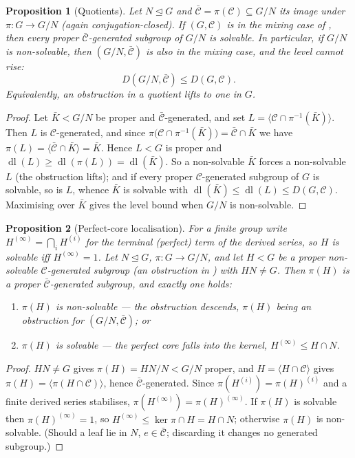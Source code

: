 \documentclass[11pt]{amsart}
\newtheorem{proposition}[proposition]{Proposition}
\theoremstyle{definition}
\theoremstyle{remark}
\theoremstyle{plain}
\theoremstyle{plain}
\numberwithin{equation}{section}
\begin{document}
\begin{proposition}[Quotients]
\label{prop:quotient}
Let $N\trianglelefteq G$ and $\bar{\mathcal C}=\pi(\mathcal C)\subseteq G/N$ its image under
$\pi:G\to G/N$ (again conjugation-closed). If $(G,\mathcal C)$ is in the mixing case of
, then every proper $\bar{\mathcal C}$-generated subgroup of $G/N$ is
solvable. In particular, if $G/N$ is non-solvable, then $(G/N,\bar{\mathcal C})$ is also in the
mixing case, and the level cannot rise:
\[
D(G/N,\bar{\mathcal C})\le D(G,\mathcal C).
\]
Equivalently, an obstruction in a quotient lifts to one in $G$.
\end{proposition}
\begin{proof}
Let $\bar K<G/N$ be proper and $\bar{\mathcal C}$-generated, and set
$L=\langle\mathcal C\cap\pi^{-1}(\bar K)\rangle$. Then $L$ is $\mathcal C$-generated, and since
$\pi\bigl(\mathcal C\cap\pi^{-1}(\bar K)\bigr)=\bar{\mathcal C}\cap\bar K$ we have
$\pi(L)=\langle\bar{\mathcal C}\cap\bar K\rangle=\bar K$. Hence $L<G$ is proper and
$\operatorname{dl}(L)\ge\operatorname{dl}(\pi(L))=\operatorname{dl}(\bar K)$. So a non-solvable
$\bar K$ forces a non-solvable $L$ (the obstruction lifts); and if every proper $\mathcal
C$-generated subgroup of $G$ is solvable, so is $L$, whence $\bar K$ is solvable with
$\operatorname{dl}(\bar K)\le\operatorname{dl}(L)\le D(G,\mathcal C)$. Maximising over $\bar K$
gives the level bound when $G/N$ is non-solvable.
\end{proof}



\begin{proposition}[Perfect-core localisation]
\label{prop:perfectcore}
For a finite group write $H^{(\infty)}=\bigcap_iH^{(i)}$ for the terminal (perfect) term of the
derived series, so $H$ is solvable iff $H^{(\infty)}=1$. Let $N\trianglelefteq G$,
$\pi\colon G\to G/N$, and let $H<G$ be a proper non-solvable $\mathcal C$-generated subgroup
(an obstruction in ) with $HN\neq G$. Then $\pi(H)$ is a proper
$\bar{\mathcal C}$-generated subgroup, and exactly one holds:
\begin{enumerate}[nosep,leftmargin=1.6em]
\item $\pi(H)$ is non-solvable --- the obstruction \emph{descends}, $\pi(H)$ being an obstruction
for $(G/N,\bar{\mathcal C})$; or
\item $\pi(H)$ is solvable --- the perfect core falls into the kernel, $H^{(\infty)}\le H\cap N$.
\end{enumerate}
\end{proposition}
\begin{proof}
$HN\neq G$ gives $\pi(H)=HN/N<G/N$ proper, and $H=\langle H\cap\mathcal C\rangle$ gives
$\pi(H)=\langle\pi(H\cap\mathcal C)\rangle$, hence $\bar{\mathcal C}$-generated. Since
$\pi(H^{(i)})=\pi(H)^{(i)}$ and a finite derived series stabilises,
$\pi(H^{(\infty)})=\pi(H)^{(\infty)}$. If $\pi(H)$ is solvable then $\pi(H)^{(\infty)}=1$, so
$H^{(\infty)}\le\ker\pi\cap H=H\cap N$; otherwise $\pi(H)$ is non-solvable. (Should a leaf lie in
$N$, $e\in\bar{\mathcal C}$; discarding it changes no generated subgroup.)
\end{proof}
\end{document}
